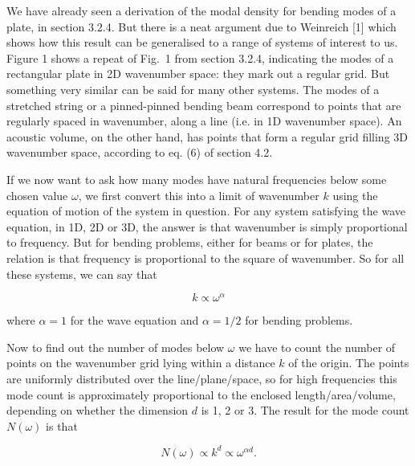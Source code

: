   We have already seen a derivation of the modal density for bending modes of a 
  plate, in section 3.2.4. But there is a neat argument due to Weinreich [1] 
  which shows how this result can be generalised to a range of systems of 
  interest to us. Figure 1 shows a repeat of Fig.\ 1 from section 3.2.4, 
  indicating the modes of a rectangular plate in 2D wavenumber space: they mark 
  out a regular grid. But something very similar can be said for many other 
  systems. The modes of a stretched string or a pinned-pinned bending beam 
  correspond to points that are regularly spaced in wavenumber, along a line 
  (i.e. in 1D wavenumber space). An acoustic volume, on the other hand, has 
  points that form a regular grid filling 3D wavenumber space, according to eq. 
  (6) of section 4.2. 


  If we now want to ask how many modes have natural frequencies below some 
  chosen value $\omega$, we first convert this into a limit of wavenumber $k$ 
  using the equation of motion of the system in question. For any system 
  satisfying the wave equation, in 1D, 2D or 3D, the answer is that wavenumber 
  is simply proportional to frequency. But for bending problems, either for 
  beams or for plates, the relation is that frequency is proportional to the 
  square of wavenumber. So for all these systems, we can say that 

  \begin{equation*}k \propto \omega^\alpha \tag{1}\end{equation*} 

  \noindent{}where $\alpha=1$ for the wave equation and $\alpha = 1/2$ for 
  bending problems. 

  Now to find out the number of modes below $\omega$ we have to count the 
  number of points on the wavenumber grid lying within a distance $k$ of the 
  origin. The points are uniformly distributed over the line/plane/space, so 
  for high frequencies this mode count is approximately proportional to the 
  enclosed length/area/volume, depending on whether the dimension $d$ is 1, 2 
  or 3. The result for the mode count $N(\omega)$ is that 

  \begin{equation*}N(\omega) \propto k^d \propto \omega^{\alpha d} . 
  \tag{2}\end{equation*} 

